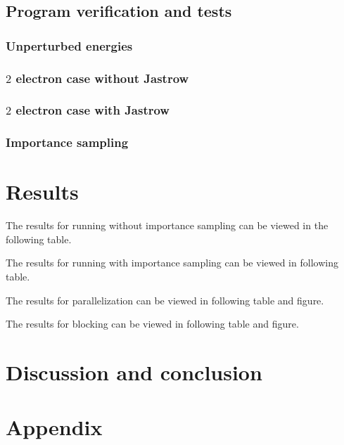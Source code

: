 \documentclass[11pt]{article}
\begin{document}
\subsection{Program verification and tests}
\subsubsection{Unperturbed energies}

\subsubsection{\texorpdfstring{$2$}{a} electron case without Jastrow}

\subsubsection{\texorpdfstring{$2$}{a} electron case with Jastrow}

\subsubsection{Importance sampling}


\section{Results}
The results for running without importance sampling can be viewed in the following table.

The results for running with importance sampling can be viewed in following table.

The results for parallelization can be viewed in following table and figure.

The results for blocking can be viewed in following table and figure.


\section{Discussion and conclusion}



\section{Appendix}
\end{document}
